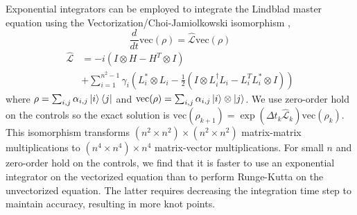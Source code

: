 Exponential integrators can be employed to integrate the Lindblad master equation
using the Vectorization/Choi-Jamiolkowski isomorphism \cite{Landi2018},
\begin{equation}
  \frac{d}{dt} \textrm{vec}({\rho}) = \hat{\mathcal{L}} \textrm{vec}({\rho})
\end{equation}
\begin{equation}
  \begin{aligned}
    \hat{\mathcal{L}} &= -i(I \otimes H - H^{T} \otimes I)\\
    &+ \sum_{i = 1}^{n^{2} - 1} \gamma_{i}
    (L_{i}^{*} \otimes L_{i} - \frac{1}{2} (I \otimes L_{i}^{\dagger}L_{i}
    - L_{i}^{T}L_{i}^{*} \otimes I))
  \end{aligned}
\end{equation}
where $\rho = \sum_{i, j} \alpha_{i, j} \ket{i}\bra{j}$
and $\textrm{vec}(\rho) = \sum_{i, j} \alpha_{i, j} \ket{i} \otimes \ket{j}$.
We use zero-order hold on the controls so the exact solution is
$\textrm{vec}(\rho_{k + 1}) = \exp(\Delta t_{k} \hat{\mathcal{L}}_{k}) \textrm{vec}(\rho_{k})$.
This isomorphism transforms $(n^{2} \times n^{2}) \times (n^{2} \times n^{2})$
matrix-matrix multiplications to $(n^{4} \times n^{4}) \times n^{4}$ matrix-vector
multiplications. For small $n$ and zero-order hold on the controls, we find that it is
faster to use an exponential integrator on the vectorized equation than to perform
Runge-Kutta on the unvectorized equation. The latter requires decreasing the integration
time step to maintain accuracy, resulting in more knot points.
